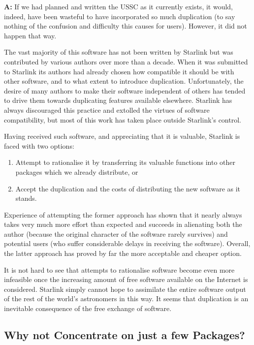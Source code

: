 \documentclass[twoside,11pt]{article}
\begin{document}
{\Large \bf A:} If we had planned and written the USSC as it currently
exists, it would, indeed, have been wasteful to have incorporated so
much duplication (to say nothing of the confusion and difficulty this
causes for users). However, it did not happen that way.

The vast majority of this software has not been written by Starlink
but was contributed by various authors over more than a decade.  When
it was submitted to Starlink its authors had already chosen how
compatible it should be with other software, and to what extent to
introduce duplication.  Unfortunately, the desire of many authors to
make their software independent of others has tended to drive them
towards duplicating features available elsewhere. Starlink has always
discouraged this practice and extolled the virtues of software
compatibility, but most of this work has taken place outside
Starlink's control.

\label{illfeeling}Having received such software, and appreciating that
it is valuable, Starlink is faced with two options:

\begin{enumerate}
\item Attempt to rationalise it by transferring its valuable functions
into other packages which we already distribute, or

\item Accept the duplication and the costs of distributing the new
software as it stands.
\end{enumerate}

Experience of attempting the former approach has shown that it nearly
always takes very much more effort than expected and succeeds in
alienating both the author (because the original character of the
software rarely survives) and potential users (who suffer considerable
delays in receiving the software). Overall, the latter approach has
proved by far the more acceptable and cheaper option.

It is not hard to see that attempts to rationalise software become
even more infeasible once the increasing amount of free software
available on the Internet is considered.  Starlink simply cannot hope
to assimilate the entire software output of the rest of the world's
astronomers in this way. It seems that duplication is an inevitable
consequence of the free exchange of software.

\subsection{\label{concentrate}Why not Concentrate on just a few Packages?}
\end{document}

